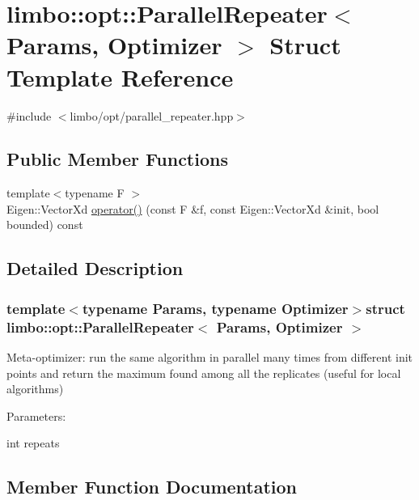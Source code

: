 \hypertarget{structlimbo_1_1opt_1_1_parallel_repeater}{}\section{limbo\+:\+:opt\+:\+:Parallel\+Repeater$<$ Params, Optimizer $>$ Struct Template Reference}
\label{structlimbo_1_1opt_1_1_parallel_repeater}


{\ttfamily \#include $<$limbo/opt/parallel\+\_\+repeater.\+hpp$>$}

\subsection*{Public Member Functions}
\begin{DoxyCompactItemize}
\item 
{\footnotesize template$<$typename F $>$ }\\Eigen\+::\+Vector\+Xd \hyperlink{structlimbo_1_1opt_1_1_parallel_repeater_ac50bb2fc1525495c2025f0ff1c0cb021}{operator()} (const F \&f, const Eigen\+::\+Vector\+Xd \&init, bool bounded) const 
\end{DoxyCompactItemize}


\subsection{Detailed Description}
\subsubsection*{template$<$typename Params, typename Optimizer$>$struct limbo\+::opt\+::\+Parallel\+Repeater$<$ Params, Optimizer $>$}

Meta-\/optimizer\+: run the same algorithm in parallel many times from different init points and return the maximum found among all the replicates (useful for local algorithms)

Parameters\+:
\begin{DoxyItemize}
\item int repeats 
\end{DoxyItemize}

\subsection{Member Function Documentation}
\hypertarget{structlimbo_1_1opt_1_1_parallel_repeater_ac50bb2fc1525495c2025f0ff1c0cb021}{}
